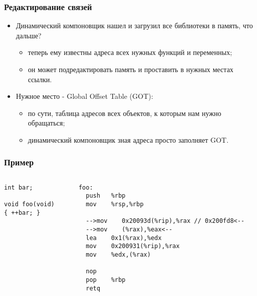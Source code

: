 \begin{frame}
\frametitle{Редактирование связей}
\begin{itemize}
  \item Динамический компоновщик нашел и загрузил все библиотеки в память, что
  дальше?
  \begin{itemize}
    \item теперь ему известны адреса всех нужных функций и переменных;
    \item он может подредактировать память и проставить в нужных местах ссылки.
  \end{itemize}
  \item Нужное место - Global Offset Table (GOT):
  \begin{itemize}
    \item по сути, таблица адресов всех объектов, к которым нам нужно
    обращаться;
    \item динамический компоновщик зная адреса просто заполняет GOT.
  \end{itemize}
\end{itemize}
\end{frame}

\begin{frame}[fragile]
\frametitle{Пример}
\begin{columns}
  \begin{column}{.3\linewidth}
    \begin{lstlisting}
int bar;

void foo(void)
{ ++bar; }
    \end{lstlisting}
  \end{column}
  \begin{column}{.6\linewidth}
    \begin{lstlisting}[style=base]
foo:
  push   %rbp
  mov    %rsp,%rbp

  -->mov    0x20093d(%rip),%rax // 0x200fd8<--
  -->mov    (%rax),%eax<--
  lea    0x1(%rax),%edx
  mov    0x200931(%rip),%rax
  mov    %edx,(%rax)

  nop
  pop    %rbp
  retq 
    \end{lstlisting}
  \end{column}
\end{columns}
\end{frame}

